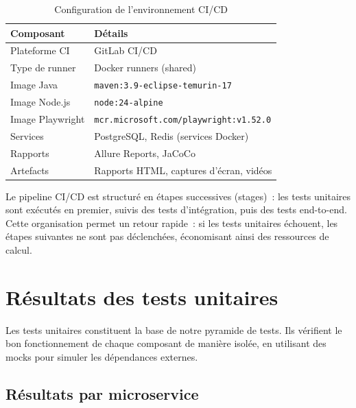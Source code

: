 \begin{table}[H]
\centering
\caption{Configuration de l'environnement CI/CD}
\label{tab:env-ci}
\begin{tabularx}{\textwidth}{|l|X|}
\hline
\rowcolor{speedlineBlue!10}
\textbf{Composant} & \textbf{D\'{e}tails} \\
\hline
Plateforme CI & GitLab CI/CD \\
\hline
Type de runner & Docker runners (shared) \\
\hline
Image Java & \texttt{maven:3.9-eclipse-temurin-17} \\
\hline
Image Node.js & \texttt{node:24-alpine} \\
\hline
Image Playwright & \texttt{mcr.microsoft.com/playwright:v1.52.0} \\
\hline
Services & PostgreSQL, Redis (services Docker) \\
\hline
Rapports & Allure Reports, JaCoCo \\
\hline
Artefacts & Rapports HTML, captures d'\'{e}cran, vid\'{e}os \\
\hline
\end{tabularx}
\end{table}

Le pipeline CI/CD est structur\'{e} en \'{e}tapes successives (stages)~: les
tests unitaires sont ex\'{e}cut\'{e}s en premier, suivis des tests d'int\'{e}gration,
puis des tests end-to-end. Cette organisation permet un retour rapide~:
si les tests unitaires \'{e}chouent, les \'{e}tapes suivantes ne sont pas
d\'{e}clench\'{e}es, \'{e}conomisant ainsi des ressources de calcul.

\section{R\'{e}sultats des tests unitaires}
\label{sec:resultats-unitaires}

Les tests unitaires constituent la base de notre pyramide de tests. Ils
v\'{e}rifient le bon fonctionnement de chaque composant de mani\`{e}re isol\'{e}e,
en utilisant des mocks pour simuler les d\'{e}pendances externes.

\subsection{R\'{e}sultats par microservice}

